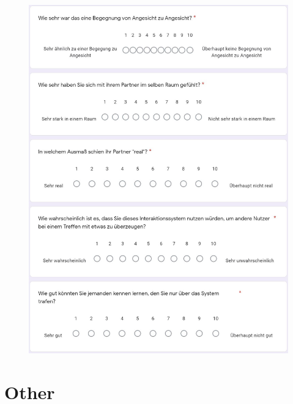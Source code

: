 \documentclass[a4paper,11pt]{article}%
\renewcommand{\\}{\vspace*{0.5\baselineskip} \newline}
\begin{document}
	\begin{figure}[H]
	\centering
		\begin{footnotesize}
			\includegraphics[scale=0.6]{Abbildungen/Fragebogen/Post-Questionnaire/PQCP6}
		\end{footnotesize}
	\end{figure}	

\section{Other}	
	
\end{document}
